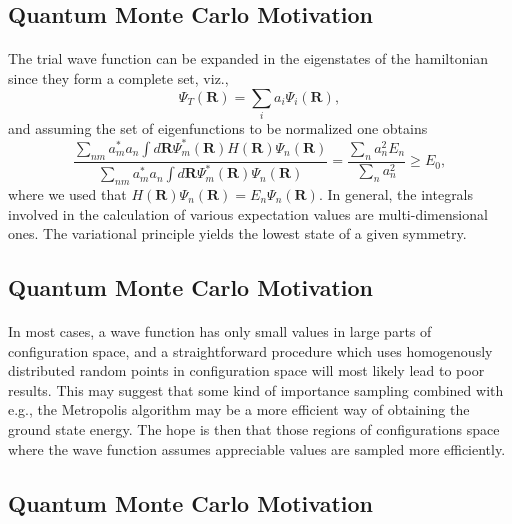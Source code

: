 \documentclass[%
twoside,                 %
final,                   %
10pt]{article}
\begin{document}
\subsection{Quantum Monte Carlo Motivation}

\paragraph{}
The trial wave function can be expanded in the eigenstates of the hamiltonian since they form a complete set, viz.,
\[
   \Psi_T(\bm{R})=\sum_i a_i\Psi_i(\bm{R}),
\]
and assuming the set of eigenfunctions to be normalized one obtains 
\[
     \frac{\sum_{nm}a^*_ma_n \int d\bm{R}\Psi^{\ast}_m(\bm{R})H(\bm{R})\Psi_n(\bm{R})}
        {\sum_{nm}a^*_ma_n \int d\bm{R}\Psi^{\ast}_m(\bm{R})\Psi_n(\bm{R})} =\frac{\sum_{n}a^2_n E_n}
        {\sum_{n}a^2_n} \ge E_0,
\]
where we used that $H(\bm{R})\Psi_n(\bm{R})=E_n\Psi_n(\bm{R})$.
In general, the integrals involved in the calculation of various  expectation
values  are multi-dimensional ones. 
The variational principle yields the lowest state of a given symmetry.




\subsection{Quantum Monte Carlo Motivation}

\paragraph{}
In most cases, a wave function has only small values in large parts of 
configuration space, and a straightforward procedure which uses
homogenously distributed random points in configuration space 
will most likely lead to poor results. This may suggest that some kind
of importance sampling combined with e.g., the Metropolis algorithm 
may be  a more efficient way of obtaining the ground state energy.
The hope is then that those regions of configurations space where
the wave function assumes appreciable values are sampled more 
efficiently.




\subsection{Quantum Monte Carlo Motivation}
\end{document}
